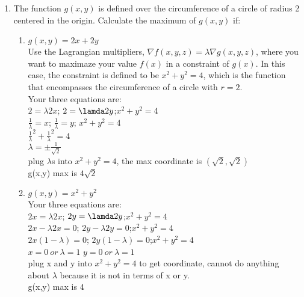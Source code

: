 \documentclass{article}
\begin{document}
\begin{enumerate}
\item The function $g(x,y)$ is defined over the circumference of a circle of radius 2 centered in the origin. Calculate the maximum of $g(x,y)$ if:
    \begin{enumerate}
    \item $g(x,y)=2x+2y$
    \\ Use the Lagrangian multipliers, $\nabla f(x,y,z)=\lambda\nabla g(x,y,z)$, where you want to maximaze your value $f(x)$ in a constraint of $g(x)$. In this case, the constraint is defined to be $x^2+y^2=4$, which is the function that encompasses the circumference of a circle with $r=2$. 
    \\ Your three equations are:
    \\ $2=\lambda 2x$; \qquad $2=\lamda 2y$;\qquad\qquad $x^2+y^2=4$
    \\ $\frac{1}{\lambda}=x$; \quad\qquad $\frac{1}{\lambda}=y$; \qquad\qquad $x^2+y^2=4$
    \\ $\frac{1}{\lambda}^2+\frac{1}{\lambda}^2=4$
    \\ $\lambda=\pm\frac{1}{\sqrt{2}}$
    \\plug $\lambda$s into $x^2+y^2=4$, the max coordinate is $(\sqrt{2},\sqrt{2})$
    \\g(x,y) max is $4\sqrt2$

    \item $g(x,y)=x^2+y^2$
    \\ Your three equations are:
    \\ $2x=\lambda 2x$; \qquad\qquad $2y=\lamda 2y$;\qquad\qquad\qquad $x^2+y^2=4$
    \\ $2x-\lambda 2x=0$; \qquad $2y-\lambda 2y=0$;\qquad\qquad $x^2+y^2=4$
    \\ $2x(1-\lambda)=0$; \qquad $2y(1-\lambda)=0$;\qquad\qquad $x^2+y^2=4$
    \\ $x=0~or~\lambda =1$ \qquad $y=0~or~\lambda =1$
    \\ plug x and y into $x^2+y^2=4$ to get coordinate, cannot do anything about $\lambda$ because it is not in terms of x or y. 
    \\g(x,y) max is $4$
    \end{enumerate}

\end{enumerate}%
\end{document}

